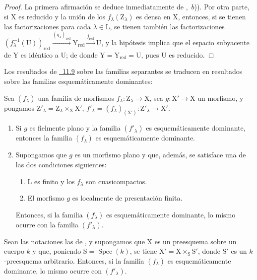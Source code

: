 \begin{proof}
La primera afirmación se deduce inmediatamente de ,~$b$)).
Por otra parte, si $\mathrm{X}$ es reducido y la unión de los $f_\lambda(\mathrm{Z}_\lambda)$ es densa en $\mathrm{X}$, entonces, si se tienen las factorizaciones  para cada $\lambda\in\mathrm{L}$, se tienen también las factorizaciones $(f_\lambda^{-1}(\mathrm{U}))_\mathrm{red}\xrightarrow{(g_\lambda)_\mathrm{red}}\mathrm{Y}_\mathrm{red}\xrightarrow{j_\mathrm{red}}\mathrm{U}$, y la hipótesis implica que el espacio subyacente de $\mathrm{Y}$ es idéntico a $\mathrm{U}$; de donde $\mathrm{Y}=\mathrm{Y}_\mathrm{red}=\mathrm{U}$, pues $\mathrm{U}$ es reducido.
\end{proof}

Los resultados de {\hyperlink{ega4.c04.subsec.11-9}{\textsection~11.9}} sobre las familias separantes se traducen en resultados sobre las familias esquemáticamente dominantes:

\begin{theorem}[11.10.5]
\label{IV.11.10.5}
Sea $(f_\lambda)$ una familia de morfismos $f_\lambda:\mathrm{Z}_\lambda\to\mathrm{X}$, sea $g:\mathrm{X}'\to\mathrm{X}$ un morfismo, y pongamos $\mathrm{Z}'_\lambda=\mathrm{Z}_\lambda\times_\mathrm{X}\mathrm{X}'$, $f'_\lambda=(f_\lambda)_{(\mathrm{X}')}:\mathrm{Z}'_\lambda\to\mathrm{X}'$.
\begin{enumerate}[label=(\roman*)]
  \item Si $g$ es fielmente plano y la familia $(f'_\lambda)$ es esquemáticamente dominante, entonces la familia $(f_\lambda)$ es esquemáticamente dominante.
  \item Supongamos que $g$ es un morfismo plano y que, además, se satisface una de las dos condiciones siguientes:
  \begin{enumerate}[label=\emph{\alph*)}]
    \item $\mathrm{L}$ es finito y los $f_\lambda$ son cuasicompactos.
    \item El morfismo $g$ es localmente de presentación finita.
  \end{enumerate}
  Entonces, si la familia $(f_\lambda)$ es esquemáticamente dominante, lo mismo ocurre con la familia $(f'_\lambda)$.
\end{enumerate}
\end{theorem}

\begin{proposition}[11.10.6]
\label{IV.11.10.6}
Sean las notaciones las de , y supongamos que $\mathrm{X}$ es un preesquema sobre un cuerpo $k$ y que, poniendo $\mathrm{S}=\operatorname{Spec}(k)$, se tiene $\mathrm{X}'=\mathrm{X}\times_\mathrm{S}\mathrm{S}'$, donde $\mathrm{S}'$ es un $k$-preesquema arbitrario.
Entonces, si la familia $(f_\lambda)$ es esquemáticamente dominante, lo mismo ocurre con $(f'_\lambda)$.
\end{proposition}

